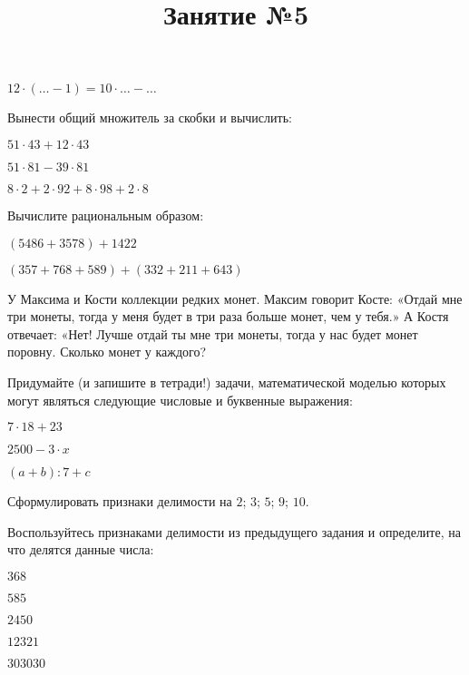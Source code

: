 \begin{class}[number=1]
\begin{listofex}
\begin{enumcols}[itemcolumns=2]
		\item \( 12\cdot({\dots}-1)=10\cdot{\dots}-{\dots} \)
	\end{enumcols}
	\item Вынести общий множитель за скобки и вычислить:
	\begin{enumcols}[itemcolumns=3]
		\item \( 51\cdot43+12\cdot43 \)
		\item \( 51\cdot81-39\cdot81 \)
		\item \( 8\cdot2+2\cdot92+8\cdot98+2\cdot8 \)
	\end{enumcols}
	\item Вычислите рациональным образом:
	\begin{enumcols}[itemcolumns=2]
		\item \( (5486+3578)+1422 \)
		\item \( (357+768+589)+(332+211+643) \)
	\end{enumcols}
	\item У Максима и Кости коллекции редких монет. Максим говорит Косте: «Отдай мне три монеты, тогда у меня будет в три раза больше
	монет, чем у тебя.» А Костя отвечает: «Нет! Лучше отдай ты мне три монеты, тогда у нас будет монет поровну. Сколько монет у каждого?
	\item Придумайте (и запишите в тетради!) задачи, математической моделью которых могут
	являться следующие числовые и буквенные выражения:
	\begin{enumcols}[itemcolumns=3]
		\item \( 7\cdot18+23 \)
		\item \( 2500 - 3\cdot x \)
		\item \( (a+b):7+c \)
	\end{enumcols}
\end{listofex}
\newpage
\title{Занятие №5}
\begin{listofex}
	\item Сформулировать признаки делимости на \( 2 \); \( 3 \); \( 5 \); \( 9 \); \( 10 \).
	\item Воспользуйтесь признаками делимости из предыдущего задания и определите, на что делятся данные числа:
	\begin{enumcols}[itemcolumns=5]
		\item \( 368 \)
		\item \( 585 \)
		\item \( 2450 \)
		\item \( 12321 \)
		\item \( 303030 \)
	\end{enumcols}

\end{listofex}
\end{class}
